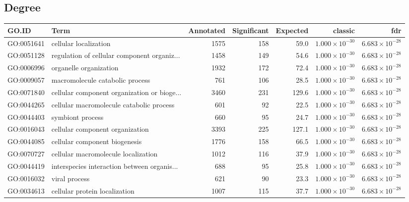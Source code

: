 \subsection{Degree}
\begin{table}[ht]
\centering
\begin{adjustbox}{max width=\textwidth}
\begin{tabular}{llrrrrr}
  \hline
GO.ID & Term & Annotated & Significant & Expected & classic & fdr \\ 
  \hline
GO:0051641 & cellular localization & 1575 & 158 & 59.0 & $1.000 \times 10^{-30}$ & $6.683 \times 10^{-28}$ \\ 
  GO:0051128 & regulation of cellular component organiz... & 1458 & 149 & 54.6 & $1.000 \times 10^{-30}$ & $6.683 \times 10^{-28}$ \\ 
  GO:0006996 & organelle organization & 1932 & 172 & 72.4 & $1.000 \times 10^{-30}$ & $6.683 \times 10^{-28}$ \\ 
  GO:0009057 & macromolecule catabolic process & 761 & 106 & 28.5 & $1.000 \times 10^{-30}$ & $6.683 \times 10^{-28}$ \\ 
  GO:0071840 & cellular component organization or bioge... & 3460 & 231 & 129.6 & $1.000 \times 10^{-30}$ & $6.683 \times 10^{-28}$ \\ 
  GO:0044265 & cellular macromolecule catabolic process & 601 & 92 & 22.5 & $1.000 \times 10^{-30}$ & $6.683 \times 10^{-28}$ \\ 
  GO:0044403 & symbiont process & 660 & 95 & 24.7 & $1.000 \times 10^{-30}$ & $6.683 \times 10^{-28}$ \\ 
  GO:0016043 & cellular component organization & 3393 & 225 & 127.1 & $1.000 \times 10^{-30}$ & $6.683 \times 10^{-28}$ \\ 
  GO:0044085 & cellular component biogenesis & 1776 & 158 & 66.5 & $1.000 \times 10^{-30}$ & $6.683 \times 10^{-28}$ \\ 
  GO:0070727 & cellular macromolecule localization & 1012 & 116 & 37.9 & $1.000 \times 10^{-30}$ & $6.683 \times 10^{-28}$ \\ 
  GO:0044419 & interspecies interaction between organis... & 688 & 95 & 25.8 & $1.000 \times 10^{-30}$ & $6.683 \times 10^{-28}$ \\ 
  GO:0016032 & viral process & 621 & 90 & 23.3 & $1.000 \times 10^{-30}$ & $6.683 \times 10^{-28}$ \\ 
  GO:0034613 & cellular protein localization & 1007 & 115 & 37.7 & $1.000 \times 10^{-30}$ & $6.683 \times 10^{-28}$ \\ 

\end{tabular}
\end{adjustbox}
\end{table}
